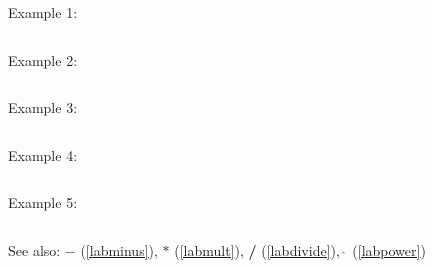 \noindent Example 1: 
\begin{center}\begin{minipage}{15cm}\begin{Verbatim}[frame=single]
\end{Verbatim}
\end{minipage}\end{center}
\noindent Example 2: 
\begin{center}\begin{minipage}{15cm}\begin{Verbatim}[frame=single]
\end{Verbatim}
\end{minipage}\end{center}
\noindent Example 3: 
\begin{center}\begin{minipage}{15cm}\begin{Verbatim}[frame=single]
\end{Verbatim}
\end{minipage}\end{center}
\noindent Example 4: 
\begin{center}\begin{minipage}{15cm}\begin{Verbatim}[frame=single]
\end{Verbatim}
\end{minipage}\end{center}
\noindent Example 5: 
\begin{center}\begin{minipage}{15cm}\begin{Verbatim}[frame=single]
\end{Verbatim}
\end{minipage}\end{center}
See also: \textbf{$-$} (\ref{labminus}), \textbf{$*$} (\ref{labmult}), \textbf{/} (\ref{labdivide}), \textbf{$\mathbf{\hat{~}}$} (\ref{labpower})
